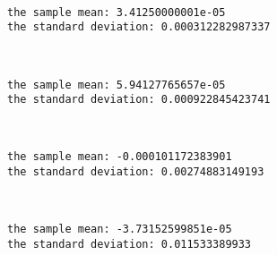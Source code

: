 \documentclass[11pt]{article}
\begin{document}
    \begin{center}
    \end{center}
    { \hspace*{\fill} \\}
    
    \begin{Verbatim}[commandchars=\\\{\}]
the sample mean: 3.41250000001e-05
the standard deviation: 0.000312282987337

    \end{Verbatim}

    \begin{center}
    \end{center}
    { \hspace*{\fill} \\}
    
    \begin{Verbatim}[commandchars=\\\{\}]
the sample mean: 5.94127765657e-05
the standard deviation: 0.000922845423741

    \end{Verbatim}

    \begin{center}
    \end{center}
    { \hspace*{\fill} \\}
    
    \begin{Verbatim}[commandchars=\\\{\}]
the sample mean: -0.000101172383901
the standard deviation: 0.00274883149193

    \end{Verbatim}

    \begin{center}
    \end{center}
    { \hspace*{\fill} \\}
    
    \begin{Verbatim}[commandchars=\\\{\}]
the sample mean: -3.73152599851e-05
the standard deviation: 0.011533389933

    \end{Verbatim}
\end{document}
